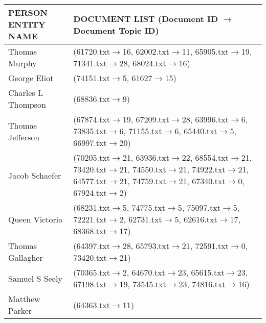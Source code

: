 \begin{table*}

  \begin{minipage}[b]{\linewidth}
  \begin{center}
 \begin{tabular}{|p{2.5cm}|p{13cm}|}
  \hline
    PERSON ENTITY NAME & DOCUMENT LIST (Document ID $\rightarrow$  Document Topic ID)\\ \hline
    Thomas Murphy        & (61720.txt$\rightarrow$16, 62002.txt$\rightarrow$11, 65905.txt$\rightarrow$19, 71341.txt$\rightarrow$28, 68024.txt$\rightarrow$16)                        \\ \hline
    George Eliot       & (74151.txt$\rightarrow$5, 61627$\rightarrow$15)                                                                                      \\ \hline
    Charles L Thompson        & (68836.txt$\rightarrow$9)                                                                         \\ \hline
    Thomas Jefferson       & (67874.txt$\rightarrow$19, 67209.txt$\rightarrow$28, 63996.txt$\rightarrow$6, 73835.txt$\rightarrow$6, 71155.txt$\rightarrow$6, 65440.txt$\rightarrow$5, 66997.txt$\rightarrow$20)                   \\ \hline
    Jacob Schaefer        & (70205.txt$\rightarrow$21, 63936.txt$\rightarrow$22, 68554.txt$\rightarrow$21, 73420.txt$\rightarrow$21, 74550.txt$\rightarrow$21, 74922.txt$\rightarrow$21, 64577.txt$\rightarrow$21, 74759.txt$\rightarrow$21, 67340.txt$\rightarrow$0, 67924.txt$\rightarrow$2)                   \\ \hline
    Queen Victoria       & (68231.txt$\rightarrow$5, 74775.txt$\rightarrow$5, 75097.txt$\rightarrow$5, 72221.txt$\rightarrow$2, 62731.txt$\rightarrow$5, 62616.txt$\rightarrow$17, 68368.txt$\rightarrow$17)                                      \\ \hline
    Thomas Gallagher        & (64397.txt$\rightarrow$28, 65793.txt$\rightarrow$21, 72591.txt$\rightarrow$0, 73420.txt$\rightarrow$21) \\ \hline
    Samuel S Seely     & (70365.txt$\rightarrow$2, 64670.txt$\rightarrow$23, 65615.txt$\rightarrow$23, 67198.txt$\rightarrow$19, 73545.txt$\rightarrow$23, 74816.txt$\rightarrow$16)                                                                 \\ \hline
    Matthew Parker      & (64363.txt$\rightarrow$11)                                                   \\ \hline

\end{tabular}
\end{center}
\end{minipage}
\end{table*}
